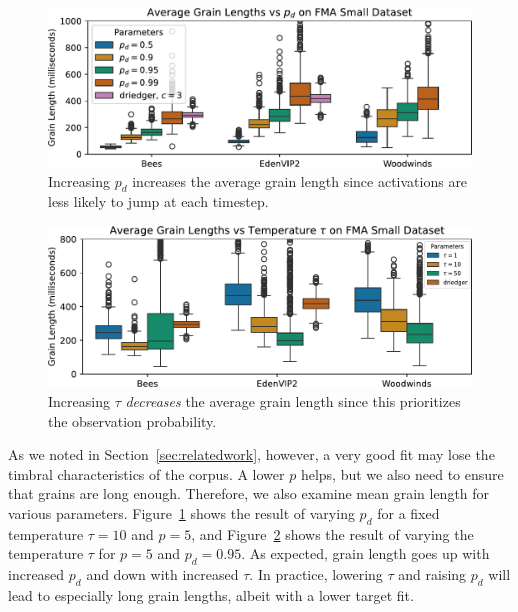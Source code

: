 \documentclass{article}
\begin{document}
\begin{figure}
    \centering
    \includegraphics[width=\columnwidth]{figs/pdGrainLengths.pdf}
    \caption{Increasing $p_d$ increases the average grain length since activations are less likely to jump at each timestep.}
    \label{fig:pdGrainLengths}
\end{figure}


\begin{figure}
    \centering
    \includegraphics[width=\columnwidth]{figs/tempGrainLengths.pdf}
    \caption{Increasing $\tau$ {\em decreases} the average grain length since this prioritizes the observation probability.}
    \label{fig:tempGrainLengths}
\end{figure}

As we noted in Section~\ref{sec:relatedwork}, however, a very good fit may lose the timbral characteristics of the corpus.  A lower $p$ helps, but we also need to ensure that grains are long enough.  Therefore, we also examine mean grain length for various parameters.  Figure~\ref{fig:pdGrainLengths} shows the result of varying $p_d$ for a fixed temperature $\tau=10$ and $p=5$, and Figure~\ref{fig:tempGrainLengths} shows the result of varying the temperature $\tau$ for $p=5$ and $p_d = 0.95$.  As expected, grain length goes up with increased $p_d$ and down with increased $\tau$.  In practice, lowering $\tau$ and raising $p_d$ will lead to especially long grain lengths, albeit with a lower target fit.
\end{document}
